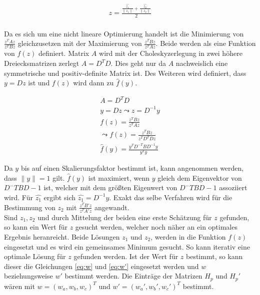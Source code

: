 \begin{gather}
	z = \frac{\frac{\hat{z_1}}{\| z_1 \|}+\frac{\hat{z_2}}{\| z_2 \|}}{2}
\end{gather}\\

Da es sich um eine nicht lineare Optimierung handelt ist die Minimierung von  $\frac{z^TAz}{z^TBz}$ gleichzusetzen mit der Maximierung von  $\frac{z^TBz}{z^TAz}$. Beide werden als eine Funktion von $f(z)$ definiert. Matrix $A$ wird mit der Choleskyzerlegung\cite{FormelsammlungMatrizen} in zwei höhere Dreiecksmatrizen zerlegt $A = D^TD$. Dies geht nur da $A$ nachweislich eine symmetrische und positiv-definite Matrix ist\cite{Fortran77,FormelsammlungMatrizen}. Des Weiteren wird definiert, dass $y = Dz$ ist und $f(z)$ wird dann zu $\hat{f}(y)$\cite{ZZ}.

\begin{gather}
	A = D^TD\\
	y= Dz \leadsto z= D^{-1}y\\
	f(z)= \frac{z^TBz}{z^TAz}\\
	\leadsto 
	f(z)=\frac{z^TBz}{z^TD^TDz}\\
	\hat{f}(y)= \frac{y^TD^{-T}BD^{-1}y}{y^Ty}
\end{gather}

Da $y$ bis auf einen Skalierungsfaktor bestimmt ist, kann angenommen werden, dass $\parallel y \parallel = 1$ gilt. $\hat{f}(y)$ ist maximiert, wenn $y$ gleich dem Eigenvektor von $D^-TBD-1$ ist, welcher mit dem größten Eigenwert von $D^-TBD-1$ assoziiert wird\cite{ZZ}. Für $\hat{z_1}$ ergibt sich $\hat{z_1} = D^{-1}y$. Exakt das selbe Verfahren wird für die Bestimmung von $z_2$ mit  $\frac{z^TB'z}{z^TA'z}$ angewandt\cite{ZZ}.\\


Sind $z_1, z_2$ und durch Mittelung der beiden eine erste Schätzung für $z$ gefunden, so kann ein Wert für $z$ gesucht werden, welcher noch näher an ein optimales Ergebnis heranreicht. Beide Lösungen $z_1$ und $z_2$, werden in die Funktion $f(z)$ eingesetzt und es wird ein gemeinsames Minimum gesucht\cite{ZZ}. So kann iterativ eine optimale Lösung für $z$ gefunden werden. Ist der Wert für $z$ bestimmt, so kann dieser die Gleichungen \ref{eq:w} und \ref{eq:w'} eingesetzt werden und $w$ beziehungsweise $w'$ bestimmt werden. Die Einträge der Matrizen $H_p$ und $H_p'$ wären mit $w = (w_a,w_b,w_c)^T$ und $w' = (w_a',w_b',w_c')^T$ bestimmt\cite{ZZ}.\\


